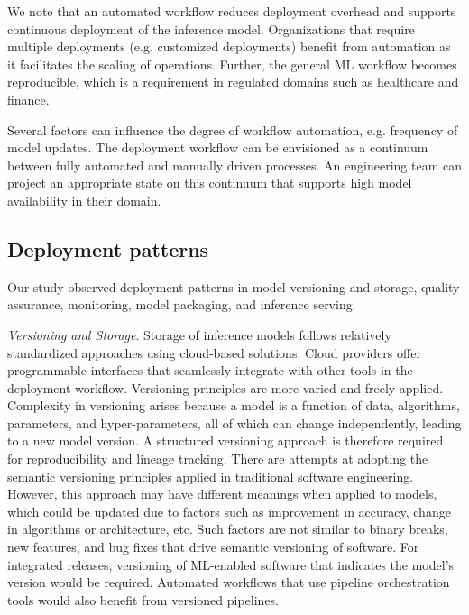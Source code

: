 We note that an automated workflow reduces deployment overhead and supports continuous deployment of the inference model. Organizations that require multiple deployments (e.g. customized deployments) benefit from automation as it facilitates the scaling of operations. Further, the general ML workflow becomes reproducible, which is a requirement in regulated domains such as healthcare and finance.

\begin{tcolorbox}[colback=white!73!white,colframe=gray!90!gray]
 Several factors can influence the degree of workflow automation, e.g. frequency of model updates. The deployment workflow can be envisioned as a continuum between fully automated and manually driven processes. An engineering team can project an appropriate state on this continuum that supports high model availability in their domain. 
\end{tcolorbox}

\subsection{Deployment patterns}
Our study observed deployment patterns in model versioning and storage, quality assurance, monitoring, model packaging, and inference serving.

\textit{Versioning and Storage}. Storage of inference models follows relatively standardized approaches using cloud-based solutions. Cloud providers offer programmable interfaces that seamlessly integrate with other tools in the deployment workflow. Versioning principles are more varied and freely applied. Complexity in versioning arises because a model is a function of data, algorithms, parameters, and hyper-parameters, all of which can change independently, leading to a new model version. A structured versioning approach is therefore required for reproducibility and lineage tracking. There are attempts at adopting the semantic versioning principles applied in traditional software engineering. However, this approach may have different meanings when applied to models, which could be updated due to factors such as improvement in accuracy, change in algorithms or architecture, etc. Such factors are not similar to binary breaks, new features, and bug fixes that drive semantic versioning of software. For integrated releases, versioning of ML-enabled software that indicates the model's version would be required. Automated workflows that use pipeline orchestration tools would also benefit from versioned pipelines.

